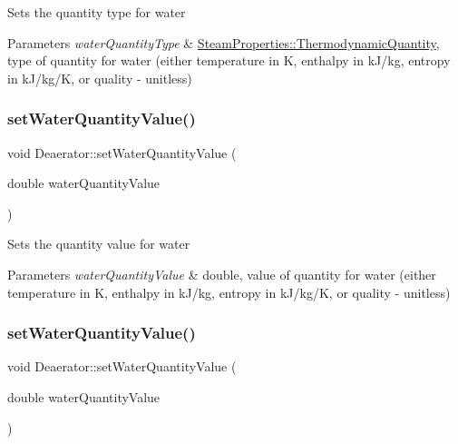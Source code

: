 Sets the quantity type for water 
\begin{DoxyParams}{Parameters}
{\em water\+Quantity\+Type} & \hyperlink{class_steam_properties_ae0294bedf7d178c2d8fb6aed0f62fbff}{Steam\+Properties\+::\+Thermodynamic\+Quantity}, type of quantity for water (either temperature in K, enthalpy in k\+J/kg, entropy in k\+J/kg/K, or quality -\/ unitless) \\
\hline
\end{DoxyParams}
\mbox{\label{class_deaerator_ac31cf2deb8bf30ee6921d1d9f8281eb8}} 
\subsubsection{\texorpdfstring{set\+Water\+Quantity\+Value()}{setWaterQuantityValue()}\hspace{0.1cm}{\footnotesize\ttfamily [1/3]}}
{\footnotesize\ttfamily void Deaerator\+::set\+Water\+Quantity\+Value (\begin{DoxyParamCaption}\item[{double}]{water\+Quantity\+Value }\end{DoxyParamCaption})}

Sets the quantity value for water 
\begin{DoxyParams}{Parameters}
{\em water\+Quantity\+Value} & double, value of quantity for water (either temperature in K, enthalpy in k\+J/kg, entropy in k\+J/kg/K, or quality -\/ unitless) \\
\hline
\end{DoxyParams}
\mbox{\label{class_deaerator_ac31cf2deb8bf30ee6921d1d9f8281eb8}} 
\subsubsection{\texorpdfstring{set\+Water\+Quantity\+Value()}{setWaterQuantityValue()}\hspace{0.1cm}{\footnotesize\ttfamily [2/3]}}
{\footnotesize\ttfamily void Deaerator\+::set\+Water\+Quantity\+Value (\begin{DoxyParamCaption}\item[{double}]{water\+Quantity\+Value }\end{DoxyParamCaption})}

